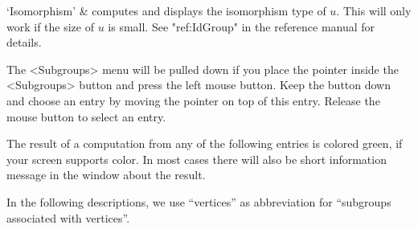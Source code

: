 `Isomorphism' &
computes and displays  the isomorphism type of  $u$.  This will only work
if the size of $u$ is small.  See "ref:IdGroup"  in the {\GAP}
reference manual for details.
\enditems

%
%
%
%
%
%
%
%
%
%


%
%
%


The <Subgroups> menu will be pulled down  if you place the pointer inside
the <Subgroups> button and press the  left mouse button.  Keep the button
down and  choose an entry by  moving  the pointer on   top of this entry.
Release the mouse button to select an entry.

The result of  a computation  from any  of  the following entries  is
colored green, if  your screen supports color.   In most cases there will
also be short information message in the {\GAP} window about the result.

In  the following descriptions, we  use ``vertices'' as abbreviation for
``subgroups associated with vertices''.

